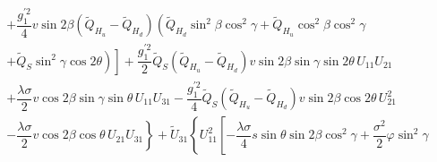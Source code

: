 \documentclass[12pt,a4paper]{article}
\begin{document}
\begin{equation}
\begin{array}{l}
\left.\left.+\dfrac{g_1^{'2}}{4}v\sin 2\beta (\tilde{Q}_{H_u}-\tilde{Q}_{H_d})\left(\tilde{Q}_{H_d}\sin^2\beta \cos^2\gamma +
\tilde{Q}_{H_u}\cos^2\beta \cos^2\gamma \right.\right.\right.\\[1mm]
\left.\left.\left.+\tilde{Q}_{S}\sin^2\gamma \cos 2\theta\right)\right]+\dfrac{g_1^{'2}}{2}\tilde{Q}_{S} (\tilde{Q}_{H_u}-\tilde{Q}_{H_d})
v\sin 2\beta \sin\gamma \sin 2\theta\, U_{11} U_{21} \right.\\[1mm]
\left.+ \dfrac{\lambda\sigma}{2}v\cos 2\beta \sin\gamma \sin\theta\, U_{11} U_{31} - \dfrac{g_1^{'2}}{4}\tilde{Q}_{S} (\tilde{Q}_{H_u}-\tilde{Q}_{H_d})
v\sin 2\beta \cos 2\theta\, U_{21}^2 \right.\\[1mm]
\left.- \dfrac{\lambda\sigma}{2}v\cos 2\beta \cos\theta\, U_{21} U_{31}\right\}
+\tilde{U}_{31}\left\{U_{11}^2 \left[-\dfrac{\lambda\sigma}{4}s\sin\theta \sin 2\beta \cos^2\gamma + \dfrac{\sigma^2}{2}\varphi\sin^2 \gamma  \right.\right.\\[1mm]
\end{array}
\label{hd30}
\end{equation}
\end{document}

